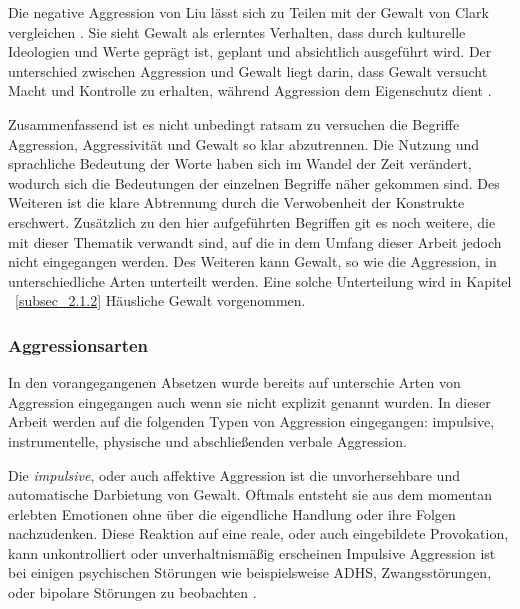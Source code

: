 Die negative Aggression von Liu lässt sich zu Teilen mit der Gewalt von Clark vergleichen \parencite{Def_Aggressivität_vs_violence, Aggression}. Sie sieht Gewalt als erlerntes Verhalten, dass durch kulturelle Ideologien und Werte geprägt ist,  geplant und absichtlich ausgeführt wird. Der unterschied zwischen Aggression und Gewalt liegt darin, dass Gewalt versucht Macht und Kontrolle zu erhalten, während Aggression dem Eigenschutz dient \parencite{Def_Aggressivität_vs_violence}.

Zusammenfassend ist es nicht unbedingt ratsam zu versuchen die Begriffe Aggression, Aggressivität und Gewalt so klar abzutrennen. Die Nutzung und sprachliche Bedeutung der Worte haben sich im Wandel der Zeit verändert, wodurch sich die Bedeutungen der einzelnen Begriffe näher gekommen sind. Des Weiteren ist die klare Abtrennung durch die Verwobenheit der Konstrukte erschwert. Zusätzlich zu den hier aufgeführten Begriffen git es noch weitere, die mit dieser Thematik verwandt sind, auf die in dem Umfang dieser Arbeit jedoch nicht eingegangen werden. Des Weiteren kann Gewalt, so wie die Aggression, in unterschiedliche Arten unterteilt werden. Eine solche Unterteilung wird in Kapitel ~\ref{subsec_2.1.2} Häusliche Gewalt vorgenommen.



\subsubsection{Aggressionsarten}    \label{subsubsec_2.1.3.1}
In den vorangegangenen Absetzen wurde bereits auf unterschie Arten von Aggression eingegangen auch wenn sie nicht explizit genannt wurden. In dieser Arbeit werden auf die folgenden Typen von Aggression eingegangen: impulsive, instrumentelle, physische und abschließenden verbale Aggression.

Die \textit{impulsive}, oder auch affektive Aggression ist die unvorhersehbare und automatische Darbietung von Gewalt. Oftmals entsteht sie aus dem momentan erlebten Emotionen ohne über die eigendliche Handlung oder ihre Folgen nachzudenken. Diese Reaktion auf eine reale, oder auch eingebildete Provokation, kann unkontrolliert oder unverhaltnismäßig erscheinen \parencite{impulsive_instrumental_aggro_healtline, impulsive_aggro} Impulsive Aggression ist bei einigen psychischen Störungen wie beispielsweise ADHS, Zwangsstörungen, oder bipolare Störungen zu beobachten \parencite{impulsive_aggro_psych_Störung}.


